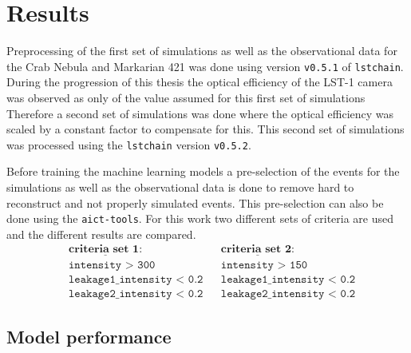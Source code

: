 \chapter{Results}
\label{ch:results}
Preprocessing of the first set of simulations as well as the observational data for the Crab Nebula and 
Markarian 421 was done using version \texttt{v0.5.1} of \texttt{lstchain}.
During the progression of this thesis the optical efficiency of the LST-1 camera was observed as only  of the value assumed for this first set of simulations
Therefore a second set of simulations was done where the optical efficiency was scaled by a constant factor to compensate for this.
This second set of simulations was processed using the \texttt{lstchain} version \texttt{v0.5.2}.

Before training the machine learning models a pre-selection of the events for the simulations as well as the observational data is done to remove 
hard to reconstruct and not properly simulated events. 
This pre-selection can also be done using the \texttt{aict-tools}.
For this work two different sets of criteria are used and the different results are compared.
\begin{align*}
    &\underline{\textbf{criteria set 1:}} & &\underline{\textbf{criteria set 2:}} \\
    &\texttt{intensity > 300} & &\texttt{intensity > 150} \\
    &\texttt{leakage1\_intensity < 0.2} & &\texttt{leakage1\_intensity < 0.2} \\
    &\texttt{leakage2\_intensity < 0.2} & &\texttt{leakage2\_intensity < 0.2}
\end{align*}


\section{Model performance}
